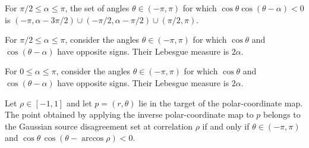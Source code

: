 \begin{theorem}
\label{FABL.angularDisagreementSet_eq_of_half_pi_le}
\leanok
{}
For $\pi/2\leq\alpha\leq\pi$, the set of angles $\theta\in(-\pi,\pi)$ for which
$\cos\theta\cos(\theta-\alpha)<0$ is
$(-\pi,\alpha-3\pi/2)\cup(-\pi/2,\alpha-\pi/2)\cup(\pi/2,\pi)$.
\end{theorem}

\begin{theorem}
\label{FABL.volume_angularDisagreementSet_of_half_pi_le}
\leanok
{}
For $\pi/2\leq\alpha\leq\pi$, consider the angles $\theta\in(-\pi,\pi)$ for which
$\cos\theta$ and $\cos(\theta-\alpha)$ have opposite signs. Their Lebesgue measure is
$2\alpha$.
\end{theorem}

\begin{theorem}
\label{FABL.volume_angularDisagreementSet}
\leanok
{}
For $0\leq\alpha\leq\pi$, consider the angles $\theta\in(-\pi,\pi)$ for which
$\cos\theta$ and $\cos(\theta-\alpha)$ have opposite signs. Their Lebesgue measure is
$2\alpha$.
\end{theorem}

\begin{theorem}
\label{FABL.gaussianSourceDisagreement_polar}
\leanok
{}
Let $\rho\in[-1,1]$ and let $p=(r,\theta)$ lie in the target of the polar-coordinate
map. The point obtained by applying the inverse polar-coordinate map to $p$ belongs to
the Gaussian source disagreement set at correlation $\rho$ if and only if
$\theta\in(-\pi,\pi)$ and $\cos\theta\,\cos(\theta-\arccos\rho)<0$.
\end{theorem}

